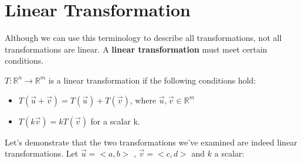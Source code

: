 \documentclass{article}
\begin{document}
\section{Linear Transformation}
\par \noindent Although we can use this terminology to describe all transformations, not all transformations are linear. A \textbf{linear transformation} must meet certain conditions.
\newline
\par \noindent \(T: \mathbb{R}^n \rightarrow \mathbb{R}^m\) is a linear transformation if the following conditions hold:
\begin{itemize}
	\item \(T(\vec u + \vec v) = T(\vec u) + T(\vec v)\), where \(\vec u,\vec v \in \mathbb{R}^m\)
	\item \(T(k \vec v) = k T( \vec v)\) for a scalar k.
\end{itemize}
\par \noindent Let's demonstrate that the two transformations we've examined are indeed linear transformations. Let \(\vec u=<a,b>\) , \( \vec v = <c,d>\) and \(k\) a scalar:
\newline
\newline
\end{document}
